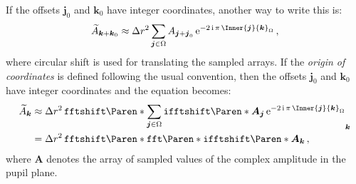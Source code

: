 \documentclass[a4paper,10pt,twocolumn]{scrartcl}
\newcommand*{\mathe}{\mathrm{e}}
\newcommand*{\mathi}{\mathrm{i}}
\newcommand*{\FT}[1]{\widetilde{#1}}
\newcommand*{\V}[1]{\boldsymbol{#1}}   %
\begin{document}
If the offsets $\V j_0$ and $\V k_0$ have integer coordinates, another way
to write this is:
\begin{equation}
  \FT{A}_{\V k + \V k_0} \approx \Delta r^2 \sum_{\V j \in \Omega}
  A_{\V j + \V j_0} \,
  \mathe^{-2\,\mathi\,\pi \, \Inner{\V j}{\V k}_{\Omega}} \, ,
\end{equation}
where circular shift is used for translating the sampled arrays.  If the
\emph{origin of coordinates} is defined following the usual convention,
then the offsets $\V j_0$ and $\V k_0$ have integer coordinates and the
equation becomes:
\begin{align}
  \FT{A}_{\V k} &\approx \Delta r^2 \,
  \mathtt{fftshift}\Paren*{
    \sum_{\V j \in \Omega}
    \mathtt{ifftshift}\Paren*{\V A}_{\V j} \,
  \mathe^{-2\,\mathi\,\pi \, \Inner{\V j}{\V k}_{\Omega}}
  }_{\V k} \\
  &= \Delta r^2 \,\mathtt{fftshift}\Paren*{\mathtt{fft}\Paren*{
    \mathtt{ifftshift}\Paren*{\V A}
  }}_{\V k} \, ,
\end{align}
where $\V A$ denotes the array of sampled values of the complex amplitude
in the pupil plane.

\footnotesize


\end{document}
